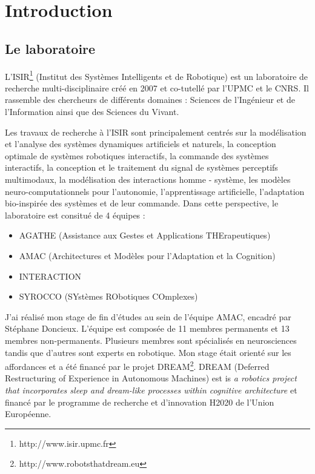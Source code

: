 \documentclass{llncs}
\begin{document}

\section{Introduction}


\subsection{Le laboratoire}

L'ISIR\footnote{http://www.isir.upmc.fr} (Institut des Systèmes Intelligents et de Robotique) est un laboratoire de recherche multi-disciplinaire créé en 2007 et co-tutellé par l'UPMC et le CNRS. Il rassemble des chercheurs de différents domaines : Sciences de l’Ingénieur et de l’Information ainsi que des Sciences du Vivant.

Les travaux de recherche à l'ISIR sont principalement centrés sur la modélisation et l'analyse des systèmes dynamiques artificiels et naturels, la conception optimale de systèmes robotiques interactifs, la commande des systèmes interactifs, la conception et le traitement du signal de systèmes perceptifs multimodaux, la modélisation des interactions homme - système, les modèles neuro-computationnels pour l’autonomie, l'apprentissage artificielle, l'adaptation bio-inspirée des systèmes et de leur commande. Dans cette perspective, le laboratoire est consitué de 4 équipes :
\begin{itemize}
\item AGATHE (Assistance aux Gestes et Applications THErapeutiques)
\item AMAC (Architectures et Modèles pour l'Adaptation et la Cognition)
\item INTERACTION
\item SYROCCO (SYstèmes RObotiques COmplexes)
\end{itemize}

J'ai réalisé mon stage de fin d'études au sein de l'équipe AMAC, encadré par Stéphane Doncieux. L'équipe est composée de 11 membres permanents et 13 membres non-permanents. Plusieurs membres sont spécialisés en neurosciences tandis que d'autres sont experts en robotique. Mon stage était orienté sur les affordances et a été financé par le projet DREAM\footnote{http://www.robotsthatdream.eu}. DREAM (Deferred Restructuring of Experience in Autonomous Machines) est is \textit{a robotics project that incorporates sleep and dream-like processes within cognitive architecture} et financé par le programme de recherche et d'innovation H2020 de l'Union Européenne.
\end{document}
